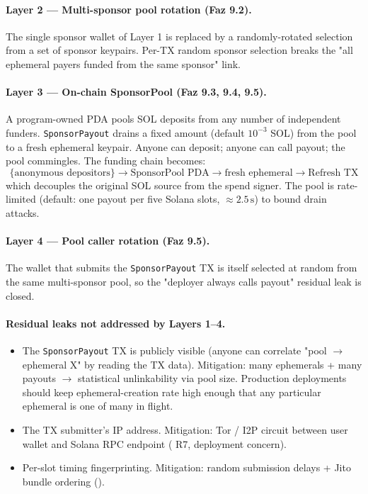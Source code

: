 \paragraph{Layer 2 — Multi-sponsor pool rotation (Faz 9.2).} The
single sponsor wallet of Layer 1 is replaced by a randomly-rotated
selection from a set of sponsor keypairs. Per-TX random sponsor
selection breaks the "all ephemeral payers funded from the same
sponsor" link.

\paragraph{Layer 3 — On-chain SponsorPool (Faz 9.3, 9.4, 9.5).}
A program-owned PDA pools SOL deposits from any number of
independent funders. \texttt{SponsorPayout} drains a fixed amount
(default $10^{-3}$ SOL) from the pool to a fresh ephemeral
keypair. Anyone can deposit; anyone can call payout; the pool
commingles. The funding chain becomes:
\[
  \{\text{anonymous depositors}\} \rightarrow \text{SponsorPool PDA} \rightarrow \text{fresh ephemeral} \rightarrow \text{Refresh TX}
\]
which decouples the original SOL source from the spend signer.
The pool is rate-limited (default: one payout per five Solana
slots, $\approx 2.5\,\text{s}$) to bound drain attacks.

\paragraph{Layer 4 — Pool caller rotation (Faz 9.5).} The wallet
that submits the \texttt{SponsorPayout} TX is itself selected at
random from the same multi-sponsor pool, so the
"deployer always calls payout" residual leak is closed.

\paragraph{Residual leaks not addressed by Layers 1--4.}

\begin{itemize}[leftmargin=2em,itemsep=0pt]
  \item The \texttt{SponsorPayout} TX is publicly visible (anyone
    can correlate "pool $\rightarrow$ ephemeral X" by reading the
    TX data). Mitigation: many ephemerals + many payouts $\rightarrow$
    statistical unlinkability via pool size. Production deployments
    should keep ephemeral-creation rate high enough that any
    particular ephemeral is one of many in flight.
  \item The TX submitter's IP address. Mitigation: Tor / I2P
    circuit between user wallet and Solana RPC endpoint
    ( R7, deployment concern).
  \item Per-slot timing fingerprinting. Mitigation: random
    submission delays + Jito bundle ordering
    ().
\end{itemize}

